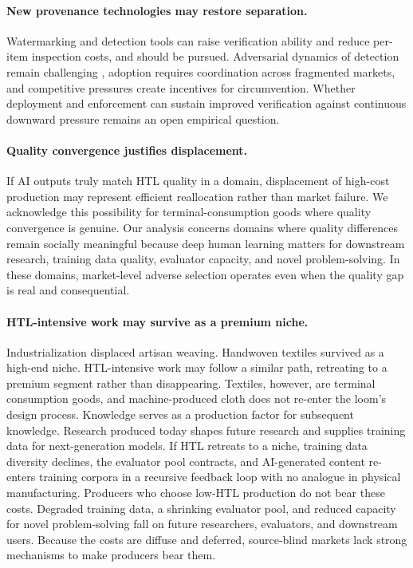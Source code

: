 \documentclass{article}
\theoremstyle{plain}
\theoremstyle{definition}
\theoremstyle{remark}
\begin{document}
\paragraph{New provenance technologies may restore separation.}
Watermarking and detection tools \citep{pmlr-v202-kirchenbauer23a, zhao2024provable, NEURIPS2023_b54d1757} can raise verification ability and reduce per-item inspection costs, and should be pursued. Adversarial dynamics of detection remain challenging \citep{sadasivan2025aigeneratedtextreliablydetected}, adoption requires coordination across fragmented markets, and competitive pressures create incentives for circumvention. Whether deployment and enforcement can sustain improved verification against continuous downward pressure remains an open empirical question.

\paragraph{Quality convergence justifies displacement.}
If AI outputs truly match HTL quality in a domain, displacement of high-cost production may represent efficient reallocation rather than market failure. We acknowledge this possibility for terminal-consumption goods where quality convergence is genuine. Our analysis concerns domains where quality differences remain socially meaningful because deep human learning matters for downstream research, training data quality, evaluator capacity, and novel problem-solving. In these domains, market-level adverse selection operates even when the quality gap is real and consequential.

\paragraph{HTL-intensive work may survive as a premium niche.}
Industrialization displaced artisan weaving. Handwoven textiles survived as a high-end niche. HTL-intensive work may follow a similar path, retreating to a premium segment rather than disappearing. Textiles, however, are terminal consumption goods, and machine-produced cloth does not re-enter the loom's design process. Knowledge serves as a production factor for subsequent knowledge. Research produced today shapes future research and supplies training data for next-generation models. If HTL retreats to a niche, training data diversity declines, the evaluator pool contracts, and AI-generated content re-enters training corpora in a recursive feedback loop with no analogue in physical manufacturing. Producers who choose low-HTL production do not bear these costs. Degraded training data, a shrinking evaluator pool, and reduced capacity for novel problem-solving fall on future researchers, evaluators, and downstream users. Because the costs are diffuse and deferred, source-blind markets lack strong mechanisms to make producers bear them.
\end{document}

